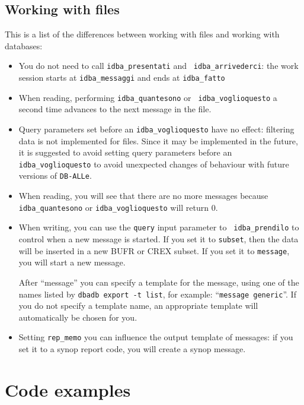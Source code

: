 \documentclass[final,12pt,a4paper,twoside]{book}
\newcommand{\dballe}{{\tt DB-ALLe}}
\begin{document}
\section{Working with files}
\label{db-file-differences}

This is a list of the differences between working with files and working with
databases:

\begin{itemize}
\item You do not need to call {\tt idba\_presentati} and {\tt
      idba\_arrivederci}: the work session starts at {\tt idba\_messaggi} and ends at
      {\tt idba\_fatto}
\item When reading, performing {\tt idba\_quantesono} or {\tt
      idba\_voglioquesto} a second time advances to the next message in the file.
\item Query parameters set before an {\tt idba\_voglioquesto} have no effect:
      filtering data is not implemented for files. Since it may be implemented
      in the future, it is suggested to avoid setting query parameters before
      an {\tt idba\_voglioquesto} to avoid unexpected changes of behaviour with
      future versions of \dballe{}.
\item When reading, you will see that there are no more messages because {\tt
      idba\_quantesono} or {\tt idba\_voglioquesto} will return 0.
\item When writing, you can use the {\tt query} input parameter to {\tt
      idba\_prendilo} to control when a new message is started.  If you set it
      to {\tt subset}, then the data will be inserted in a new BUFR or CREX
      subset.  If you set it to {\tt message}, you will start a new message.

      After ``message'' you can specify a template for the message, using one
      of the names listed by {\tt dbadb export -t list}, for example: ``{\tt message
      generic}''.  If you do not specify a template name, an appropriate template
      will automatically be chosen for you.
\item Setting {\tt rep\_memo} you can influence the output template of
      messages: if you set it to a synop report code, you will create a synop
      message.
\end{itemize}


\chapter{Code examples}
\label{ch-examples}
\end{document}
